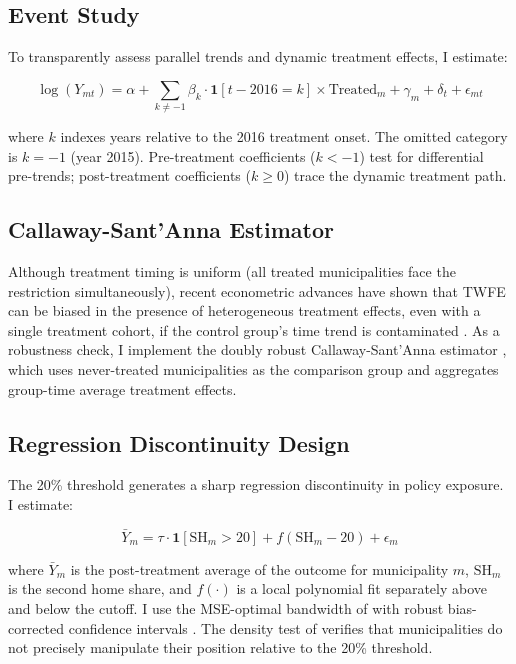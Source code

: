 \documentclass[12pt]{article}
\begin{document}
\subsection{Event Study}

To transparently assess parallel trends and dynamic treatment effects, I estimate:

\begin{equation}\label{eq:eventstudy}
\log(Y_{mt}) = \alpha + \sum_{k \neq -1} \beta_k \cdot \mathbf{1}[t - 2016 = k] \times \text{Treated}_m + \gamma_m + \delta_t + \epsilon_{mt}
\end{equation}

\noindent where $k$ indexes years relative to the 2016 treatment onset. The omitted category is $k = -1$ (year 2015). Pre-treatment coefficients ($k < -1$) test for differential pre-trends; post-treatment coefficients ($k \geq 0$) trace the dynamic treatment path.

\subsection{Callaway-Sant'Anna Estimator}

Although treatment timing is uniform (all treated municipalities face the restriction simultaneously), recent econometric advances have shown that TWFE can be biased in the presence of heterogeneous treatment effects, even with a single treatment cohort, if the control group's time trend is contaminated \citep{goodmanbacon2021, decharistos2024}. As a robustness check, I implement the doubly robust Callaway-Sant'Anna estimator \citep{callawaysantanna2021}, which uses never-treated municipalities as the comparison group and aggregates group-time average treatment effects.

\subsection{Regression Discontinuity Design}

The 20\% threshold generates a sharp regression discontinuity in policy exposure. I estimate:

\begin{equation}\label{eq:rdd}
\bar{Y}_m = \tau \cdot \mathbf{1}[\text{SH}_m > 20] + f(\text{SH}_m - 20) + \epsilon_m
\end{equation}

\noindent where $\bar{Y}_m$ is the post-treatment average of the outcome for municipality $m$, $\text{SH}_m$ is the second home share, and $f(\cdot)$ is a local polynomial fit separately above and below the cutoff. I use the MSE-optimal bandwidth of \citet{calonicoetal2020} with robust bias-corrected confidence intervals \citep{calonicoetal2014}. The density test of \citet{cattaneoetal2020} verifies that municipalities do not precisely manipulate their position relative to the 20\% threshold.
\end{document}

